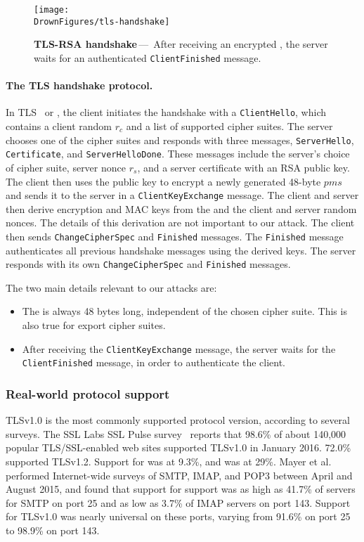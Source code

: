 \ifsubmit\relax\else
\begin{figure}
	\texttt{[image: \\DrownFigures/tls-handshake]} 
	\caption{\textbf{TLS-RSA handshake}\,---\,%
    After receiving an encrypted \pms, the server waits for an authenticated
	\texttt{ClientFinished} message.
	}
	\label{fig:tls-handshake}
\end{figure}
\fi

\paragraph{The TLS handshake protocol.}
In TLS~\cite{rfc5246} or \sslthree, the client initiates the handshake with a \texttt{ClientHello}, which contains a client random $r_c$ and a list of supported cipher suites. The server chooses one of the cipher suites and responds with three messages, \texttt{ServerHello}, \texttt{Certificate}, and \texttt{ServerHelloDone}. These messages include the server's choice of cipher suite, server nonce $r_s$, and a server certificate with an RSA public key. The client then uses the public key to encrypt a newly generated 48-byte \pms $pms$ and sends it to the server in a \texttt{ClientKeyExchange} message. The client and server then derive encryption and MAC keys from the \pms and the client and server random nonces. The details of this derivation are not important to our attack.  The client then sends \texttt{ChangeCipherSpec} and \texttt{Finished} messages. The \texttt{Finished} message authenticates all previous handshake messages using the derived keys. The server responds with its own \texttt{ChangeCipherSpec} and \texttt{Finished} messages.

The two main details relevant to our attacks are:
\begin{itemize}
	\item The \pms is always 48 bytes long, independent of the chosen cipher suite.  This is also true for export cipher suites.
	\item After receiving the \texttt{ClientKeyExchange} message, the server waits for the \texttt{ClientFinished} message, in order to authenticate the client.
\end{itemize}


\subsubsection{Real-world protocol support}
TLSv1.0 is the most commonly supported protocol version, according to several
surveys. The SSL Labs SSL Pulse survey~\cite{ssl-pulse} reports that 98.6\%
of about 140,000 popular TLS/SSL-enabled web sites supported TLSv1.0 in
January 2016. 72.0\% supported TLSv1.2. Support for \ssltwo was at 9.3\%, and
\sslthree was at 29\%. Mayer et al.~\cite{mail-tls-mayer-2015} performed
Internet-wide surveys of SMTP, IMAP, and POP3 between April and August 2015,
and found that support for \ssltwo support was as high as 41.7\% of servers
for SMTP on port 25 and as low as 3.7\% of IMAP servers on port 143. Support
for TLSv1.0 was nearly universal on these ports, varying from 91.6\% on port
25 to 98.9\% on port 143.

